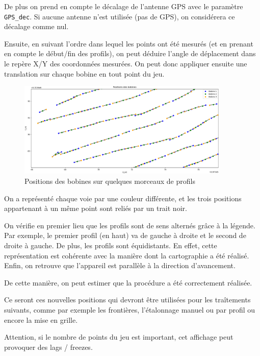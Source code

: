 \documentclass[12pt]{article}
\begin{document}
    De plus on prend en compte le décalage de l'antenne GPS avec le paramètre \texttt{GPS\_dec}. Si aucune antenne n'est utilisée (pas de GPS), on considérera ce décalage comme nul.

    Ensuite, en suivant l'ordre dans lequel les points ont été mesurés (et en prenant en compte le début/fin des profils), on peut déduire l'angle de déplacement dans le repère X/Y des coordonnées mesurées. On peut donc appliquer ensuite une translation sur chaque bobine en tout point du jeu.

    \begin{figure}[ht!]
        \begin{center}
            \includegraphics[width=0.90\textwidth]{Images/SepVoies_plot.png}
            \caption{Positions des bobines sur quelques morceaux de profils}
        \end{center}
    \end{figure}

    On a représenté chaque voie par une couleur différente, et les trois positions appartenant à un même point sont reliés par un trait noir.

    On vérifie en premier lieu que les profils sont de sens alternés grâce à la légende. Par exemple, le premier profil (en haut) va de gauche à droite et le second de droite à gauche. De plus, les profils sont équidistants. En effet, cette représentation est cohérente avec la manière dont la cartographie a été réalisé. Enfin, on retrouve que l'appareil est parallèle à la direction d'avancement.

    De cette manière, on peut estimer que la procédure a été correctement réalisée.

    Ce seront ces nouvelles positions qui devront être utilisées pour les traîtements suivants, comme par exemple les frontières, l'étalonnage manuel ou par profil ou encore la mise en grille.

    Attention, si le nombre de points du jeu est important, cet affichage peut provoquer des lags / freezes.
\end{document}
